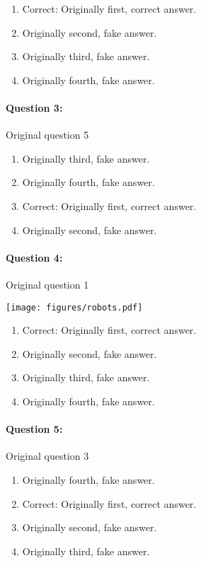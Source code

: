 \documentclass[9pt, twoside, twocolumn]{extarticle}
\renewcommand{\includegraphics}[2][]{\OldIncludegraphics[width=\linewidth, #1]{#2}}
\renewcommand{\caption}{}
\let\origfigure=\figure
\let\endorigfigure=\endfigure
\renewenvironment{figure}[1][]{%
  \origfigure[H]
}{%
  \endorigfigure
}
\begin{document}
\begin{enumerate}[label=\textbf{{\Alph*}},labelindent=0pt, labelsep=1.5em, parsep=0.2em]
\item Correct: Originally first, correct answer.
\item Originally second, fake answer.
\item Originally third, fake answer.
\item Originally fourth, fake answer.
\end{enumerate}
\paragraph{Question 3:}
Original question 5

\begin{enumerate}[label=\textbf{{\Alph*}},labelindent=0pt, labelsep=1.5em, parsep=0.2em]
\item Originally third, fake answer.
\item Originally fourth, fake answer.
\item Correct: Originally first, correct answer.
\item Originally second, fake answer.
\end{enumerate}
\paragraph{Question 4:}
Original question 1

\begin{figure}\centering
\texttt{[image: figures/robots.pdf]}
\caption{\end{figure}
\begin{enumerate}[label=\textbf{{\Alph*}},labelindent=0pt, labelsep=1.5em, parsep=0.2em]
\item Correct: Originally first, correct answer.
\item Originally second, fake answer.
\item Originally third, fake answer.
\item Originally fourth, fake answer.
\end{enumerate}
\paragraph{Question 5:}
Original question 3

\begin{enumerate}[label=\textbf{{\Alph*}},labelindent=0pt, labelsep=1.5em, parsep=0.2em]
\item Originally fourth, fake answer.
\item Correct: Originally first, correct answer.
\item Originally second, fake answer.
\item Originally third, fake answer.
\end{enumerate}
\end{document}
